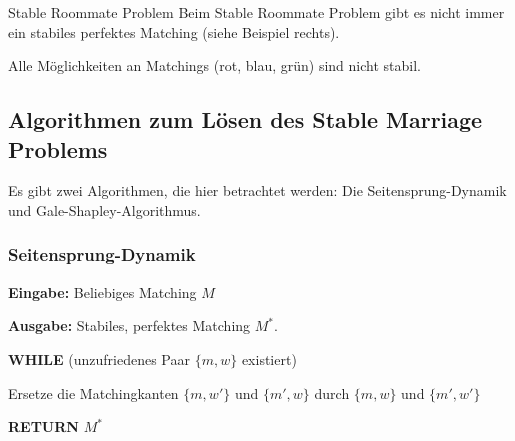 \documentclass{panikzettel}
\newcommand\tab[1][1cm]{\hspace*{#1}}
\begin{document}
{\begin{halfboxl}
\begin{defi}{Stable Roommate Problem}
		Beim Stable Roommate Problem gibt es nicht immer ein stabiles perfektes Matching (siehe Beispiel rechts).
	\end{defi}
\end{halfboxl}%
\begin{halfboxr}
	\vspace{-\baselineskip}	
	\begin{center}
		
		Alle Möglichkeiten an Matchings (rot, blau, grün) sind nicht stabil.
	\end{center}
\end{halfboxr}

\subsection{Algorithmen zum Lösen des Stable Marriage Problems}

Es gibt zwei Algorithmen, die hier betrachtet werden: Die Seitensprung-Dynamik und Gale-Shapley-Algorithmus.

\subsubsection{Seitensprung-Dynamik}
\begin{algo}
	\textbf{Eingabe:} Beliebiges Matching $M$
	
	\textbf{Ausgabe:} Stabiles, perfektes Matching $M^*$.
	\tcblower
	
	\textbf{WHILE} (unzufriedenes Paar $\{m,w\}$ existiert)

	\tab Ersetze die Matchingkanten $\{m,w'\}$ und $\{m',w\}$ durch $\{m,w\}$ und $\{m',w'\}$
   
	\textbf{RETURN} $M^*$
	
\end{algo}

}
\end{document}
